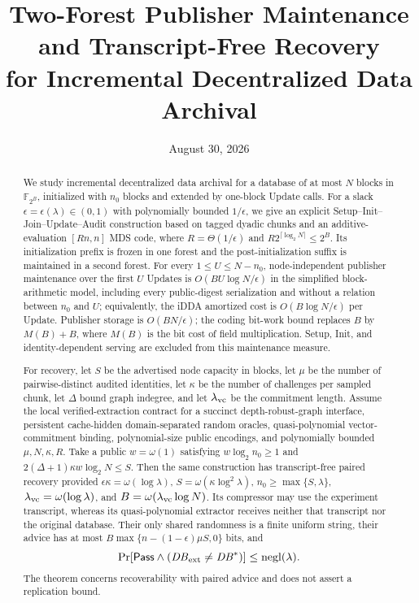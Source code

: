 \documentclass[11pt]{article}
\title{Two-Forest Publisher Maintenance and Transcript-Free Recovery\\
for Incremental Decentralized Data Archival}
\author{}
\date{August 30, 2026}
\begin{document}

\maketitle

\begin{abstract}
We study incremental decentralized data archival for a database of at most
$N$ blocks in $\mathbb F_{2^B}$, initialized with $n_0$ blocks and extended by
one-block Update calls.  For a slack
$\epsilon=\epsilon(\lambda)\in(0,1)$ with polynomially bounded
$1/\epsilon$, we give an explicit Setup--Init--Join--Update--Audit construction
based on tagged dyadic chunks and an additive-evaluation $[Rn,n]$ MDS code,
where $R=\Theta(1/\epsilon)$ and
$R2^{\lceil\log_2N\rceil}\le 2^B$.  Its initialization prefix is frozen in one
forest and the post-initialization suffix is maintained in a second forest.
For every $1\le U\le N-n_0$, node-independent publisher maintenance over the
first $U$ Updates is $O(BU\log N/\epsilon)$ in the simplified block-arithmetic
model, including every public-digest serialization and without a relation
between $n_0$ and $U$; equivalently, the iDDA amortized cost is
$O(B\log N/\epsilon)$ per Update.  Publisher storage is $O(BN/\epsilon)$; the coding
bit-work bound replaces $B$ by $M(B)+B$, where $M(B)$ is the bit cost of field
multiplication.  Setup, Init, and identity-dependent serving are excluded from
this maintenance measure.

For recovery, let $S$ be the advertised node capacity in blocks, let $\mu$ be
the number of pairwise-distinct audited identities, let $\kappa$ be the number
of challenges per sampled chunk, let $\Delta$ bound graph indegree, and let
$\lambda_{\rm vc}$ be the commitment length.  Assume the local
verified-extraction contract for a succinct depth-robust-graph interface,
persistent cache-hidden domain-separated random oracles, quasi-polynomial
vector-commitment binding, polynomial-size public encodings, and polynomially
bounded $\mu,N,\kappa,R$.  Take a public $w=\omega(1)$ satisfying
$w\log_2n_0\ge1$ and
$2(\Delta+1)\kappa w\log_2N\le S$.  Then the same construction has
transcript-free paired recovery provided
$\epsilon\kappa=\omega(\log\lambda)$,
$S=\omega(\kappa\log^2\lambda)$,
$n_0\ge\max\{S,\lambda\}$,
$\lambda_{\rm vc}=\omega(\log\lambda)$, and
$B=\omega(\lambda_{\rm vc}\log N)$.  Its compressor may use the experiment
transcript, whereas its quasi-polynomial extractor receives neither that
transcript nor the original database.  Their only shared randomness is a
finite uniform string, their advice has at most
$B\max\{n-(1-\epsilon)\mu S,0\}$ bits, and
\[
 \Pr[\mathsf{Pass}\wedge(\mathit{DB}_{\rm ext}\ne\mathit{DB}^{*})]
 \le\operatorname{negl}(\lambda).
\]
The theorem concerns recoverability with paired advice and does not assert a
replication bound.
\end{abstract}
\end{document}
